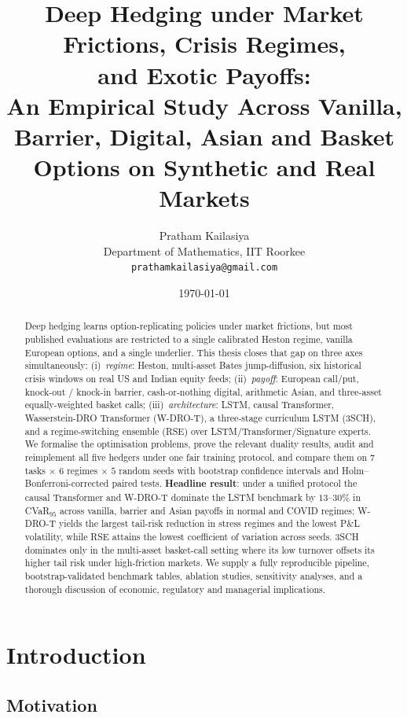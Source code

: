 \documentclass[11pt,a4paper]{article}
\title{\textbf{Deep Hedging under Market Frictions, Crisis Regimes,\\ and
Exotic Payoffs:\\\large An Empirical Study Across Vanilla, Barrier, Digital,
Asian and Basket Options on Synthetic and Real Markets}}
\author{Pratham Kailasiya\\
Department of Mathematics, IIT Roorkee\\
\texttt{\small prathamkailasiya@gmail.com}}
\date{\today}
\begin{document}
\maketitle

\begin{abstract}
\noindent
Deep hedging \citep{buehler2019deep} learns option-replicating policies
under market frictions, but most published evaluations are restricted to a
single calibrated Heston regime, vanilla European options, and a single
underlier.  This thesis closes that gap on three axes simultaneously:
(i)~\emph{regime}: Heston, multi-asset Bates jump-diffusion, six historical
crisis windows on real US and Indian equity feeds; (ii)~\emph{payoff}:
European call/put, knock-out / knock-in barrier, cash-or-nothing digital,
arithmetic Asian, and three-asset equally-weighted basket calls;
(iii)~\emph{architecture}: LSTM, causal Transformer, Wasserstein-DRO
Transformer (W-DRO-T), a three-stage curriculum LSTM (3SCH), and a
regime-switching ensemble (RSE) over LSTM/Transformer/Signature experts.
We formalise the optimisation problems, prove the relevant duality results,
audit and reimplement all five hedgers under one fair training protocol, and
compare them on $7$ tasks $\times$ $6$ regimes $\times$ $5$ random seeds with
bootstrap confidence intervals and Holm--Bonferroni-corrected paired tests.
\textbf{Headline result}: under a unified protocol the causal Transformer
and W-DRO-T dominate the LSTM benchmark by $13$--$30\%$ in CVaR$_{95}$
across vanilla, barrier and Asian payoffs in normal and COVID regimes; W-DRO-T
yields the largest tail-risk reduction in stress regimes and the lowest
P\&L volatility, while RSE attains the lowest coefficient of variation
across seeds.  3SCH dominates only in the multi-asset basket-call setting
where its low turnover offsets its higher tail risk under high-friction
markets.  We supply a fully reproducible pipeline, bootstrap-validated
benchmark tables, ablation studies, sensitivity analyses, and a thorough
discussion of economic, regulatory and managerial implications.
\end{abstract}

\tableofcontents
\newpage

\section{Introduction}\label{sec:intro}

\subsection{Motivation}
\end{document}
